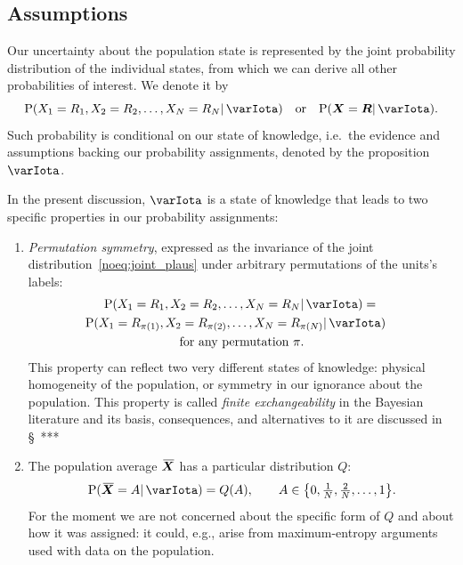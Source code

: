 \documentclass{article}
\theoremstyle{remark}
\theoremstyle{innote}
\newcommand*{\citep}{\parencites}
\renewcommand*{\|}{\mathpunct{|}}%
\DeclarePairedDelimiter\set{\{}{\}}
\newcommand*{\p}{\mathrm{P}}%
\newcommand*{\sect}{\S}%
\newcommand*{\ie}{{i.e.}}
\newcommand*{\eg}{{e.g.}}
\theoremstyle{simple}
\newcommand*{\widebar}[1]{{\mkern1.5mu\skew{2}\overline{\mkern-1.5mu#1\mkern-1.5mu}\mkern 1.5mu}}
\newcommand*{\av}{\widebar} %
\newcommand*{\yX}{\bm{X}}%
\newcommand*{\yXf}{\av{\yX}}%
\newcommand*{\yR}{\bm{R}}%
\newcommand*{\yH}{\varIota}
\begin{document}
\subsection{Assumptions}
\label{nosec:assumptions}

Our uncertainty about the population state is represented by the joint
probability distribution of the individual states, from which we can
derive all other probabilities of interest. We denote it by
\begin{equation}
  \label{noeq:joint_plaus}
  \p(X_1=R_1, X_2=R_2, \dotsc, X_N=R_N \| \yH) \quad\text{or}\quad
\p(\yX =\yR \| \yH).
\end{equation}
Such probability is conditional on our state of knowledge, \ie\ the
evidence and assumptions backing our probability assignments, denoted by
the proposition $\yH$.

In the present discussion, $\yH$ is a state of knowledge that leads to two
specific properties in our probability assignments:

\medskip
\begin{enumerate}%
\item \emph{Permutation symmetry}, expressed as the invariance of the
  joint distribution~\eqref{noeq:joint_plaus} under arbitrary permutations of
  the units's labels:
\begin{multline}
  \label{noeq:homog_math}
  \p(X_1=R_1, X_2=R_2, \dotsc, X_N=R_N \| \yH) ={}
\\ 
\shoveright{\p(X_1=R_{\pi(1)}, X_2=R_{\pi(2)}, \dotsc, X_N=R_{\pi(N)} \| \yH)}
\\
\text{for any permutation $\pi$}.
\end{multline}
This property can reflect two very different states of knowledge: physical
homogeneity of the population, or symmetry in our ignorance about the population.
This property is called \emph{finite exchangeability} in the Bayesian
literature and its basis, consequences, and alternatives to it are discussed
in \sect~***%

\medskip

\item The population average $\yXf$ has a particular distribution $Q$:
\begin{equation}
  \label{noeq:pop_average_Q}
  \p(\yXf = A \| \yH)
=  Q(A),
\qquad
A \in \set*{0,\tfrac{1}{N},\tfrac{2}{N},\dotsc,1}.
\end{equation}
For the moment we are not concerned about the specific form of $Q$ and
about how it was assigned: it could, \eg, arise from maximum-entropy
arguments
\citep[\eg:][]{jaynes1957,jaynes1963,good1963,jaynes1967,aczeletal1975,jaynes1979b,vancampenhoutetal1981,sivia1990,fangetal1997,bretthorst2013}
used with data on the population.
\end{enumerate}
\end{document}
